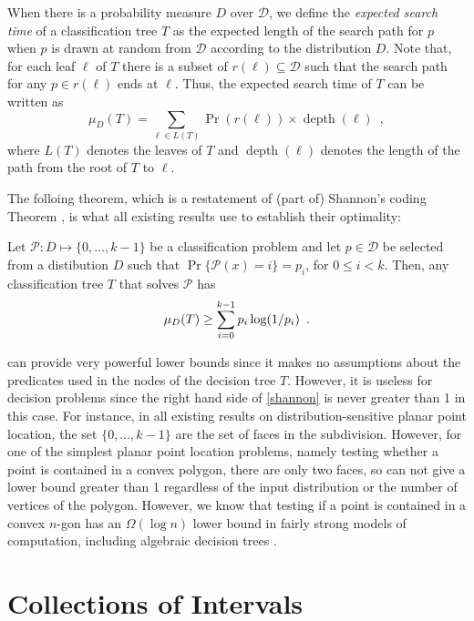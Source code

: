 \documentclass[charterfonts,lotsofwhite]{patmorin}
\DeclareMathOperator{\depth}{depth}
\begin{document}
When there is a probability measure $D$ over $\mathcal{D}$, we define
the \emph{expected search time} of a classification tree $T$ as the
expected length of the search path for $p$ when $p$ is drawn at random
from $\mathcal{D}$ according to the distribution $D$.  Note that, for
each leaf $\ell$ of $T$ there is a subset of $r(\ell)\subseteq
\mathcal{D}$ such that the search path for any $p\in r(\ell)$ ends at
$\ell$.  Thus, the expected search time of $T$ can be written as
\[
     \mu_D(T) = \sum_{\ell\in L(T)} \Pr(r(\ell))\times \depth(\ell)
	\enspace ,
\]
where $L(T)$ denotes the leaves of $T$ and $\depth(\ell)$ denotes the
length of the path from the root of $T$ to $\ell$.

The folloing theorem, which is a restatement of (part of) Shannon's
coding Theorem \cite{sXX}, is what all existing results use to
establish their optimality:

\begin{thm}
Let $\mathcal{P}:D\mapsto \{0,\ldots,k-1\}$ be a classification
problem and let $p\in \mathcal{D}$ be selected from a distibution $D$ such
that $\Pr\{\mathcal{P}(x)= i\}=p_i$, for $0\le i< k$.  Then, any
classification tree $T$ that solves $\mathcal{P}$ has
\begin{equation}
     \mu_D(T) \ge \sum_{i=0}^{k-1} p_i\log(1/p_i) \enspace .
	\eqlabel{shannon}
\end{equation}
\end{thm}

 can provide very powerful lower bounds since it makes
no assumptions about the predicates used in the nodes of the decision
tree $T$.  However, it is useless for decision problems since the
right hand side of \eqref{shannon} is never greater than 1 in this
case.  For instance, in all existing results on distribution-sensitive
planar point location, the set $\{0,\ldots,k-1\}$ are the set of faces
in the subdivision.  However, for one of the simplest planar point
location problems, namely testing whether a point is contained in a
convex polygon, there are only two faces, so  can not
give a lower bound greater than 1 regardless of the input distribution
or the number of vertices of the polygon.  However, we know 
that testing if a point is contained in a convex $n$-gon has an
$\Omega(\log n)$ lower bound in fairly strong models of computation,
including algebraic decision trees \cite{bo}.

\section{Collections of Intervals}
\end{document}

